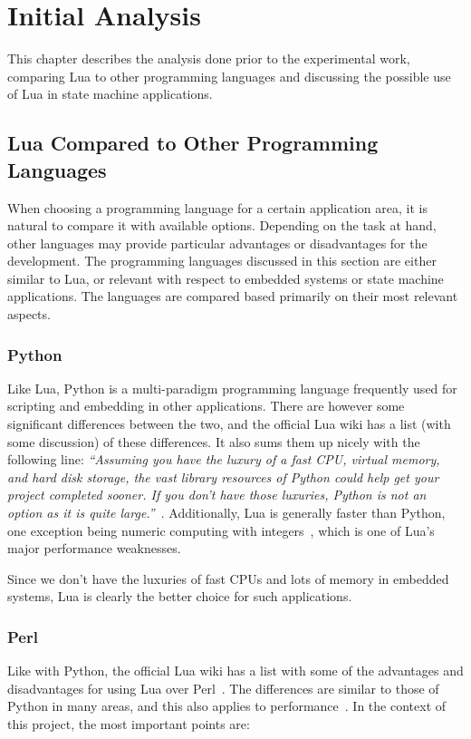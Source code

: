 \chapter{Initial Analysis}
\label{ch:initial_analysis}
This chapter describes the analysis done prior to the experimental work, comparing Lua to other programming languages and discussing the possible use of Lua in state machine applications.

\section{Lua Compared to Other Programming Languages}
\label{sec:lua_compared}
When choosing a programming language for a certain application area, it is natural to compare it with available options. Depending on the task at hand, other languages may provide particular advantages or disadvantages for the development. The programming languages discussed in this section are either similar to Lua, or relevant with respect to embedded systems or state machine applications. The languages are compared based primarily on their most relevant aspects.

\subsection{Python}
\label{sec:lua_vs_python}
Like Lua, Python is a multi-paradigm programming language frequently used for scripting and embedding in other applications. There are however some significant differences between the two, and the official Lua wiki has a list (with some discussion) of these differences. It also sums them up nicely with the following line: \emph{``Assuming you have the luxury of a fast CPU, virtual memory, and hard disk storage, the vast library resources of Python could help get your project completed sooner. If you don't have those luxuries, Python is not an option as it is quite large.''}~\cite{website:lua_wiki_python}. Additionally, Lua is generally faster than Python, one exception being numeric computing with integers~\cite{website:lua_perl_python_vs}, which is one of Lua's major performance weaknesses.

Since we don't have the luxuries of fast CPUs and lots of memory in embedded systems, Lua is clearly the better choice for such applications.

\subsection{Perl}
\label{sec:lua_vs_perl}
Like with Python, the official Lua wiki has a list with some of the advantages and disadvantages for using Lua over Perl~\cite{website:lua_wiki_perl}. The differences are similar to those of Python in many areas, and this also applies to performance~\cite{website:lua_perl_python_vs}. In the context of this project, the most important points are:

